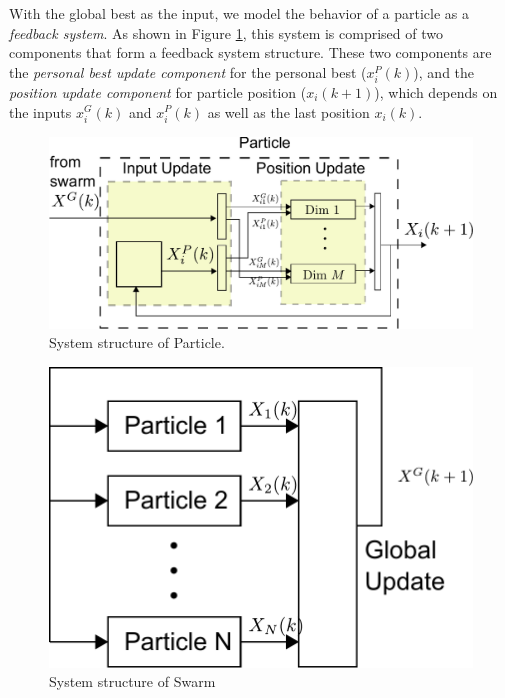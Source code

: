 With the global best as the input, we model the behavior of a particle as a \emph{feedback system}.
As shown in Figure \ref{fig:sys_flow}, this system is comprised of two components that form a feedback system structure.
These two components are the 
\emph{personal best update component} for the personal best ($ x^{P}_{i}(k) $), and the 
\emph{position update component} for particle position ($ x_{i}(k+1) $), which depends on the inputs $ x^{G}_{i}(k) $ and $ x^{P}_{i}(k) $ as well as the last position $ x_{i}(k) $.

\begin{figure}
\centering
\includegraphics[width=0.85\linewidth]{./fig/sys_flow.pdf}
\caption{System structure of Particle.}
\label{fig:sys_flow}
\end{figure}

\begin{figure}
\centering
\includegraphics[width=0.6\linewidth]{./fig/pso_sys_flow.pdf}
\caption{System structure of Swarm}
\label{fig:pso_sys_flow}
\end{figure}

